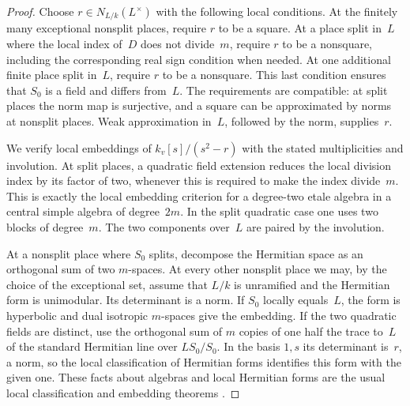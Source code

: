 \begin{proof}
Choose $r\in N_{L/k}(L^\times)$ with the following local conditions.
At the finitely many exceptional nonsplit places, require $r$ to be a
square.  At a place split in~$L$ where the local index of~$D$ does not
divide~$m$, require $r$ to be a nonsquare, including the corresponding
real sign condition when needed.  At one additional finite place
split in~$L$, require $r$ to be a nonsquare.  This last condition
ensures that $S_0$ is a field and differs from~$L$.  The requirements
are compatible: at split places the norm map is surjective, and a
square can be approximated by norms at nonsplit places.  Weak
approximation in~$L$, followed by the norm, supplies~$r$.

We verify local embeddings of $k_v[s]/(s^2-r)$ with the stated
multiplicities and involution.  At split places, a quadratic field
extension reduces the local division index by its factor of two,
whenever this is required to make the index divide~$m$.  This is
exactly the local embedding criterion for a degree-two etale algebra
in a central simple algebra of degree~$2m$.  In the split quadratic
case one uses two blocks of degree~$m$.  The two components over~$L$
are paired by the involution.

At a nonsplit place where $S_0$ splits, decompose the Hermitian space
as an orthogonal sum of two $m$-spaces.  At every other nonsplit place
we may, by the choice of the exceptional set, assume that $L/k$ is
unramified and the Hermitian form is unimodular.  Its determinant is
a norm.  If $S_0$ locally equals~$L$, the form is hyperbolic and dual
isotropic $m$-spaces give the embedding.  If the two quadratic fields
are distinct, use the orthogonal sum of $m$ copies of one half the
trace to~$L$ of the standard Hermitian line over $LS_0/S_0$.  In the
basis $1,s$ its determinant is~$r$, a norm, so the local
classification of Hermitian forms identifies this form with the
given one.  These facts about algebras and local Hermitian forms are
the usual local classification and embedding theorems
\cite{Reiner,KMRT}.


\end{proof}
